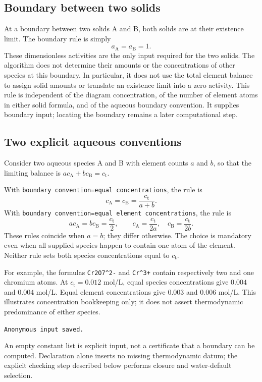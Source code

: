\documentclass[a4paper,11pt]{ltxdoc}
\begin{document}
\subsection{Boundary between two solids}
At a boundary between two solids A and B, both solids are at their existence
limit. The boundary rule is simply
\[
  a_{\mathrm A}=a_{\mathrm B}=1.
\]
These dimensionless activities are the only input required for the two solids.
The algorithm does not determine their amounts or the concentrations of other
species at this boundary. In particular, it does not use the total element
balance to assign solid amounts or translate an existence limit into a zero
activity. This rule is independent of the diagram concentration, of the number
of element atoms in either solid formula, and of the aqueous boundary convention.
It supplies boundary input; locating the boundary remains a later computational
step.

\subsection{Two explicit aqueous conventions}
Consider two aqueous species A and B with element counts $a$ and $b$, so that the
limiting balance is $a c_{\mathrm A}+b c_{\mathrm B}=c_{\mathrm t}$.

With \texttt{boundary convention=equal concentrations}, the rule is
\[
 c_{\mathrm A}=c_{\mathrm B}
   =\frac{c_{\mathrm t}}{a+b}.
\]
With \texttt{boundary convention=equal element concentrations}, the rule is
\[
 a c_{\mathrm A}=b c_{\mathrm B}=\frac{c_{\mathrm t}}{2},\qquad
 c_{\mathrm A}=\frac{c_{\mathrm t}}{2a},\quad
 c_{\mathrm B}=\frac{c_{\mathrm t}}{2b}.
\]
These rules coincide when $a=b$; they differ otherwise. The choice is mandatory
even when all supplied species happen to contain one atom of the element.
Neither rule sets both species concentrations equal to $c_{\mathrm t}$.

For example, the formulas \texttt{Cr2O7\string^2-} and \texttt{Cr\string^3+}
contain respectively two and one chromium atoms. At $c_{\mathrm t}=0.012$ mol/L,
equal species concentrations give $0.004$ and $0.004$ mol/L. Equal element
concentrations give $0.003$ and $0.006$ mol/L. This illustrates concentration
bookkeeping only; it does not assert thermodynamic predominance of either species.

\begin{codeexample}[width=3.2cm]
\let\chromiumhandle\pgfplotslastpourbaix
\texttt{Anonymous input saved.}
\end{codeexample}
An empty constant list is explicit input, not a certificate that a boundary can
be computed. Declaration alone inserts no missing thermodynamic datum; the
explicit checking step described below performs closure and water-default selection.
\end{document}
